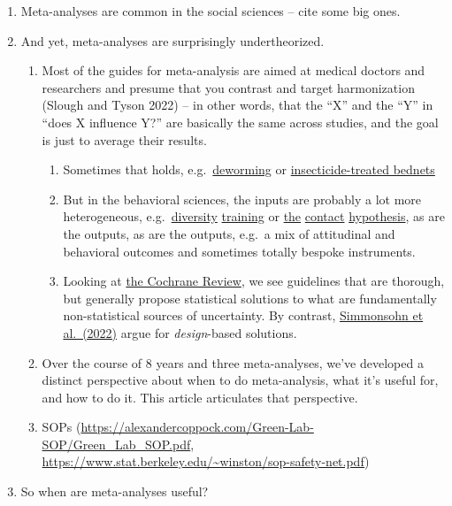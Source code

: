 \documentclass[
  man]{apa6}
\providecommand{\tightlist}{%
  \setlength{\itemsep}{0pt}\setlength{\parskip}{0pt}}
\begin{document}
\begin{enumerate}
\def\labelenumi{\arabic{enumi}.}
\tightlist
\item
  Meta-analyses are common in the social sciences -- cite some big ones.
\item
  And yet, meta-analyses are surprisingly undertheorized.

  \begin{enumerate}
  \def\labelenumii{\arabic{enumii}.}
  \tightlist
  \item
    Most of the guides for meta-analysis are aimed at medical doctors and researchers and presume that you contrast and target harmonization (Slough and Tyson 2022) -- in other words, that the ``X'' and the ``Y'' in ``does X influence Y?'' are basically the same across studies, and the goal is just to average their results.

    \begin{enumerate}
    \def\labelenumiii{\arabic{enumiii}.}
    \tightlist
    \item
      Sometimes that holds, e.g.~\href{https://scholar.harvard.edu/files/kremer/files/meta-analysis_deworming_world_bank_working_paper_dec_2016.pdf}{deworming} or \href{https://www.mmv.org/sites/default/files/uploads/docs/access/SMC_Tool_Kit/publications/Meremikww-ipt-review.pdf}{insecticide-treated bednets}
    \item
      But in the behavioral sciences, the inputs are probably a lot more heterogeneous, e.g.~\href{https://psycnet.apa.org/record/2016-43598-001}{diversity} \href{https://compass.onlinelibrary.wiley.com/doi/10.1111/spc3.12741?af=R}{training} or \href{https://pubmed.ncbi.nlm.nih.gov/16737372/}{the} \href{https://psycnet.apa.org/record/2015-07056-001}{contact} \href{https://journals.sagepub.com/doi/abs/10.1177/1088868318762647}{hypothesis}, as are the outputs, as are the outputs, e.g.~a mix of attitudinal and behavioral outcomes and sometimes totally bespoke instruments.
    \item
      Looking at \href{https://training.cochrane.org/handbook/current/chapter-10}{the Cochrane Review}, we see guidelines that are thorough, but generally propose statistical solutions to what are fundamentally non-statistical sources of uncertainty. By contrast, \href{https://www.nature.com/articles/s44159-022-00101-8}{Simmonsohn et al.~(2022)} argue for \emph{design}-based solutions.
    \end{enumerate}
  \item
    Over the course of 8 years and three meta-analyses, we've developed a distinct perspective about when to do meta-analysis, what it's useful for, and how to do it. This article articulates that perspective.
  \item
    SOPs (\url{https://alexandercoppock.com/Green-Lab-SOP/Green_Lab_SOP.pdf}, \url{https://www.stat.berkeley.edu/~winston/sop-safety-net.pdf})
  \end{enumerate}
\item
  So when are meta-analyses useful?
\end{enumerate}
\end{document}
